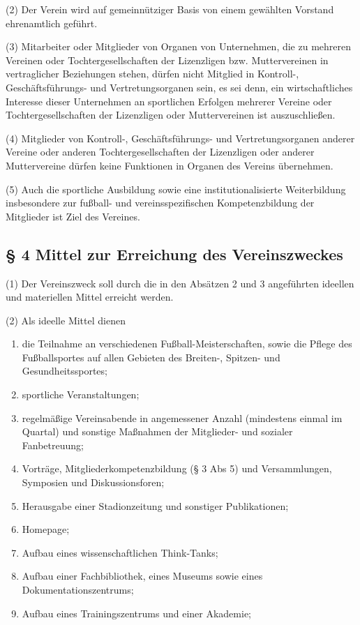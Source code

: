 \documentclass[10pt,a4paper]{article}
\begin{document}
(2)
Der Verein wird auf gemeinnütziger Basis von einem gewählten Vorstand ehrenamtlich geführt.

(3)
Mitarbeiter oder Mitglieder von Organen von Unternehmen, die zu mehreren Vereinen oder Tochtergesellschaften der Lizenzligen bzw. Muttervereinen in vertraglicher Beziehungen stehen, dürfen nicht Mitglied in Kontroll-, Geschäftsführungs- und Vertretungsorganen sein, es sei denn, ein wirtschaftliches Interesse dieser Unternehmen an sportlichen Erfolgen mehrerer Vereine oder Tochtergesellschaften der Lizenzligen oder Muttervereinen ist auszuschließen.

(4)
Mitglieder von Kontroll-, Geschäftsführungs- und Vertretungsorganen anderer Vereine oder anderen Tochtergesellschaften der Lizenzligen oder anderer Muttervereine dürfen keine Funktionen in Organen des Vereins übernehmen.

(5)
Auch die sportliche Ausbildung sowie eine institutionalisierte Weiterbildung insbesondere zur fußball- und vereinsspezifischen Kompetenzbildung der Mitglieder ist Ziel des Vereines.

\subsection{§ 4
Mittel zur Erreichung des Vereinszweckes}

(1)
Der Vereinszweck soll durch die in den Absätzen 2 und 3 angeführten ideellen und materiellen Mittel erreicht werden.

(2)
Als ideelle Mittel dienen

\begin{enumerate}[label=\alph*)]
\item
die Teilnahme an verschiedenen Fußball-Meisterschaften, sowie die Pflege des Fußballsportes auf allen Gebieten des Breiten-, Spitzen- und Gesundheitssportes;
\item
sportliche Veranstaltungen;
\item
regelmäßige Vereinsabende in angemessener Anzahl (mindestens einmal im Quartal) und sonstige Maßnahmen der Mitglieder- und sozialer Fanbetreuung;
\item
Vorträge, Mitgliederkompetenzbildung (§ 3 Abs 5) und Versammlungen, Symposien und Diskussionsforen;
\item
Herausgabe einer Stadionzeitung und sonstiger Publikationen;
\item
Homepage;
\item
Aufbau eines wissenschaftlichen Think-Tanks;
\item
Aufbau einer Fachbibliothek, eines Museums sowie eines Dokumentationszentrums;
\item
Aufbau eines Trainingszentrums und einer Akademie;
\end{enumerate}
\end{document}
